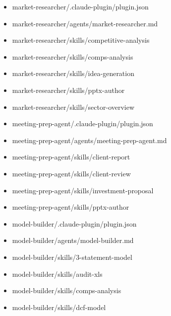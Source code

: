 \documentclass[11pt]{article}
\begin{document}
\begin{itemize}[leftmargin=*,itemsep=1pt,topsep=2pt]
\item \hspace*{1.8em}market-researcher/.claude-plugin/plugin.json
\item \hspace*{1.8em}market-researcher/agents/market-researcher.md
\item \hspace*{1.8em}market-researcher/skills/competitive-analysis
\item \hspace*{1.8em}market-researcher/skills/comps-analysis
\item \hspace*{1.8em}market-researcher/skills/idea-generation
\item \hspace*{1.8em}market-researcher/skills/pptx-author
\item \hspace*{1.8em}market-researcher/skills/sector-overview
\item \hspace*{1.8em}meeting-prep-agent/.claude-plugin/plugin.json
\item \hspace*{1.8em}meeting-prep-agent/agents/meeting-prep-agent.md
\item \hspace*{1.8em}meeting-prep-agent/skills/client-report
\item \hspace*{1.8em}meeting-prep-agent/skills/client-review
\item \hspace*{1.8em}meeting-prep-agent/skills/investment-proposal
\item \hspace*{1.8em}meeting-prep-agent/skills/pptx-author
\item \hspace*{1.8em}model-builder/.claude-plugin/plugin.json
\item \hspace*{1.8em}model-builder/agents/model-builder.md
\item \hspace*{1.8em}model-builder/skills/3-statement-model
\item \hspace*{1.8em}model-builder/skills/audit-xls
\item \hspace*{1.8em}model-builder/skills/comps-analysis
\item \hspace*{1.8em}model-builder/skills/dcf-model

\end{itemize}
\end{document}
